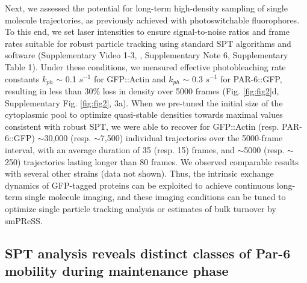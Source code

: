  
 Next, we assessed the potential for long-term high-density sampling of single molecule trajectories, as previously achieved with photoswitchable fluorophores. To this end, we set laser intensities to ensure signal-to-noise ratios and frame rates suitable for robust particle tracking using standard SPT algorithms and software (Supplementary Video 1-3, \cite{nmeth26,nmeth27}, Supplementary Note 6, Supplementary Table 1). Under these conditions, we measured effective photobleaching rate constants $k_{ph}$ $\sim$ 0.1 $s^{-1}$ for GFP::Actin and $k_{ph}$ $\sim$ 0.3 $s^{-1}$ for PAR-6::GFP, resulting in less than 30\% loss in density over 5000 frames (Fig. \ref{fig:fig2}d, Supplementary Fig. \ref{fig:fig2}, 3a). When we pre-tuned the initial size of the cytoplasmic pool to optimize quasi-stable densities towards maximal values consistent with robust SPT, we were able to recover for GFP::Actin (resp. PAR-6::GFP) $\sim$30,000 (resp. $\sim$7,500) individual trajectories over the 5000-frame interval, with an average duration of 35 (resp. 15) frames, and $\sim$5000 (resp. $\sim$250) trajectories lasting longer than 80 frames. We observed comparable results with several other strains (data not shown). Thus, the intrinsic exchange dynamics of GFP-tagged proteins can be exploited to achieve continuous long-term single molecule imaging, and these imaging conditions can be tuned to optimize single particle tracking analysis or estimates of bulk turnover by smPReSS.
 
 
 \subsection{SPT analysis reveals distinct classes of Par-6 mobility during maintenance phase}
 
